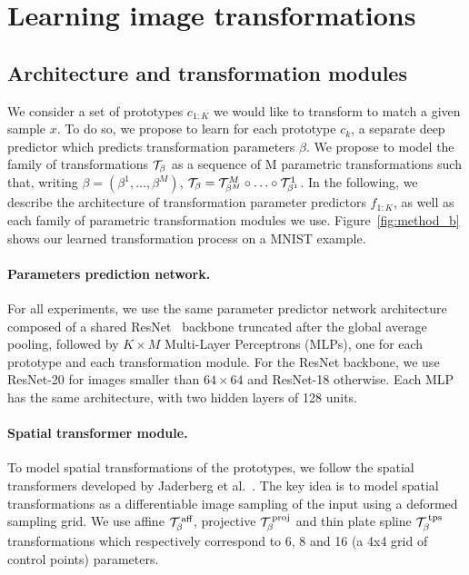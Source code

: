 \documentclass{article}
\begin{document}
\section{Learning image transformations}\label{sec:learning}

\subsection{Architecture and transformation modules}
\label{sec:transfo}
We consider a set of prototypes $c_{1:K}$ we would like to transform to match a given sample 
$x$. To do so, we propose to learn for each prototype $c_k$, a separate deep predictor which 
predicts transformation parameters $\beta$. We propose to model the family of transformations  
${\mathcal T}_{\beta}$ as a sequence of M parametric transformations such that, writing 
$\beta=(\beta^1, \ldots,\beta^M)$, ${\mathcal T}_{\beta} = {\mathcal T}^{M}_{\beta^M} \circ \dotsc \circ 
{\mathcal T}^{1}_{\beta^1}$. In the following, we describe the architecture of transformation 
parameter predictors $f_{1:K}$, as well as each family of parametric transformation modules 
we use.  Figure~\ref{fig:method_b} shows our learned transformation process on a MNIST 
example.

\vspace{-0.7em}
\paragraph{Parameters prediction network.} For all experiments, we use the same parameter 
predictor network architecture composed of a shared ResNet~\cite{heDeepResidualLearning2016}
backbone truncated after the global average pooling, followed by $K\times M$ Multi-Layer 
Perceptrons (MLPs), one for each prototype and each transformation module. For the ResNet 
backbone, we use ResNet-20 for images smaller than $64\times 64$ and ResNet-18 otherwise. 
Each MLP has the same architecture, with two hidden layers of 128 units.

\vspace{-0.7em}
\paragraph{Spatial transformer module.}  To model spatial transformations of the prototypes, 
we follow the spatial transformers developed by Jaderberg et  
al.~\cite{jaderbergSpatialTransformerNetworks2015}. The key idea is to model spatial 
transformations as a differentiable image sampling of the input using a deformed sampling 
grid. We use affine ${\mathcal T}^{\,\textrm{aff}}_\beta$, projective ${\mathcal T}^{\,\textrm{proj}}_\beta$ 
and thin plate spline 
${\mathcal T}^{\,\textrm{tps}}_\beta$~\cite{booksteinPrincipalWarpsThinplate1989} transformations 
which respectively correspond to 6, 8 and 16 (a 4x4 grid of control points) parameters.
\end{document}
